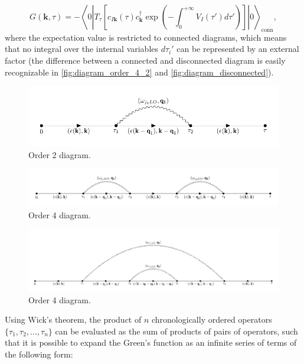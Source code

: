 \begin{equation}
    G(\mathbf{k},\tau)=-\left\langle 0 \left| T_\tau\left[c_{I\mathbf{k}}(\tau)c^\dagger_\mathbf{k}\exp{\left(-\int_0^{+\infty}V_I(\tau')d\tau'\right)}\right]\right|0\right\rangle_{\text{conn}},
    \label{GF_polaron_expansion_00}
\end{equation}
where the expectation value is restricted to connected diagrams, which means that no integral over the internal variables $d\tau_i'$ can be represented 
by an external factor (the difference between a connected and disconnected diagram is easily recognizable in \ref{fig:diagram_order_4_2} and 
\ref{fig:diagram_disconnected}).
\begin{figure}[H]
    \centering
    \includegraphics[scale=0.745]{diagram_order_2.pdf}
    \caption{Order 2 diagram.}
    \label{fig:diagram_order_2}
\end{figure}
\vspace{1.5cm}
\begin{figure}[H]
    \centering
    \includegraphics[scale=0.735]{diagram_order_4_1.pdf}
    \caption{Order 4 diagram.}
    \label{fig:diagram_order_4_1}
\end{figure}
\begin{figure}[H]
    \centering
    \includegraphics[scale=0.58]{diagram_order_4_3.pdf}
    \caption{Order 4 diagram.}
    \label{fig:diagram_order_4_3}
\end{figure}
Using Wick's theorem, the product of $n$ chronologically ordered operators $\{\tau_1,\tau_2,...,\tau_n\}$ can be evaluated as the sum 
of products of pairs of operators, such that it is possible to expand the Green's function as an infinite series of terms of the following form:
